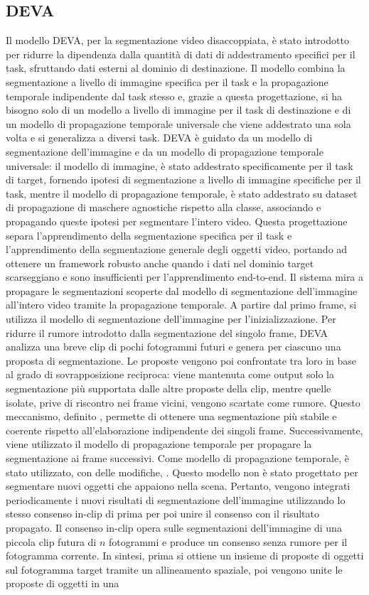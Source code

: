 \subsection{DEVA}
Il modello DEVA, per la segmentazione video disaccoppiata, è stato introdotto per ridurre la dipendenza dalla quantità di dati di addestramento specifici per il task, sfruttando dati esterni al dominio di destinazione. Il modello combina la segmentazione a livello di immagine specifica per il task e la propagazione temporale indipendente dal task stesso e, grazie a questa progettazione, si ha bisogno solo di un modello a livello di immagine per il task di destinazione e di un modello di propagazione temporale universale che viene addestrato una sola volta e si generalizza a diversi task. DEVA è guidato da un modello di segmentazione dell'immagine e da un modello di propagazione temporale universale: il modello di immagine, è stato addestrato specificamente per il task di target, fornendo ipotesi di segmentazione a livello di immagine specifiche per il task, mentre il modello di propagazione temporale, è stato addestrato su dataset di propagazione di maschere agnostiche rispetto alla classe, associando e propagando queste ipotesi per segmentare l'intero video. Questa progettazione separa l'apprendimento della segmentazione specifica per il task e l'apprendimento della segmentazione generale degli oggetti video, portando ad ottenere un framework robusto anche quando i dati nel dominio target scarseggiano e sono insufficienti per l'apprendimento end-to-end. Il sistema mira a propagare le segmentazioni scoperte dal modello di segmentazione dell'immagine all'intero video tramite la propagazione temporale. A partire dal primo frame, si utilizza il modello di segmentazione dell'immagine per l'inizializzazione. Per ridurre il rumore introdotto dalla segmentazione del singolo frame, DEVA analizza una breve clip di pochi fotogrammi futuri e genera per ciascuno una proposta di segmentazione. Le proposte vengono poi confrontate tra loro in base al grado di sovrapposizione reciproca: viene mantenuta come output solo la segmentazione più supportata dalle altre proposte della clip, mentre quelle isolate, prive di riscontro nei frame vicini, vengono scartate come rumore. Questo meccanismo, definito , permette di ottenere una segmentazione più stabile e coerente rispetto all'elaborazione indipendente dei singoli frame. Successivamente, viene utilizzato il modello di propagazione temporale per propagare la segmentazione ai frame successivi. Come modello di propagazione temporale, è stato utilizzato, con delle modifiche, . Questo modello non è stato progettato per segmentare nuovi oggetti che appaiono nella scena. Pertanto, vengono integrati periodicamente i nuovi risultati di segmentazione dell'immagine utilizzando lo stesso consenso in-clip di prima per poi unire il consenso con il risultato propagato. Il consenso in-clip opera sulle segmentazioni dell'immagine di una piccola clip futura di $n$ fotogrammi e produce un consenso senza rumore per il fotogramma corrente. In sintesi, prima si ottiene un insieme di proposte di oggetti sul fotogramma target tramite un allineamento spaziale, poi vengono unite le proposte di oggetti in una 